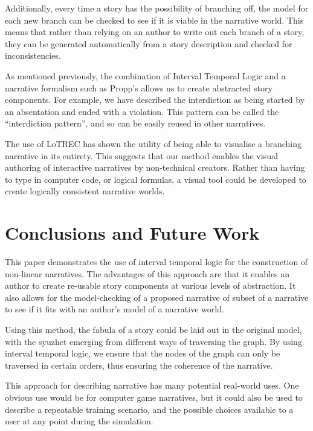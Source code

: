 \documentclass{llncs}
\begin{document}
Additionally, every time a story has the possibility of branching off, the model for each new branch can be checked to see if it is viable in the narrative world. This means that rather than relying on an author to write out each branch of a story, they can be generated automatically from a story description and checked for inconsistencies.

As mentioned previously, the combination of Interval Temporal Logic and a narrative formalism such as Propp's allows us to create abstracted story components. For example, we have described the interdiction as being started by an absentation and ended with a violation. This pattern can be called the ``interdiction pattern'', and so can be easily reused in other narratives.

The use of LoTREC has shown the utility of being able to visualise a branching narrative in its entirety. This suggests that our method enables the visual authoring of interactive narratives by non-technical creators. Rather than having to type in computer code, or logical formulas, a visual tool could be developed to create logically consistent narrative worlds.

\section{Conclusions and Future Work}
This paper demonstrates the use of interval temporal logic for the construction of non-linear narratives. The advantages of this approach are that it enables an author to create re-usable story components at various levels of abstraction. It also allows for the model-checking of a proposed narrative of subset of a narrative to see if it fits with an author's model of a narrative world.

Using this method, the fabula of a story could be laid out in the original model, with the syuzhet emerging from different ways of traversing the graph. By using interval temporal logic, we ensure that the nodes of the graph can only be traversed in certain orders, thus ensuring the coherence of the narrative.

This approach for describing narrative has many potential real-world uses. One obvious use would be for computer game narratives, but it could also be used to describe a repeatable training scenario, and the possible choices available to a user at any point during the simulation.
\end{document}
